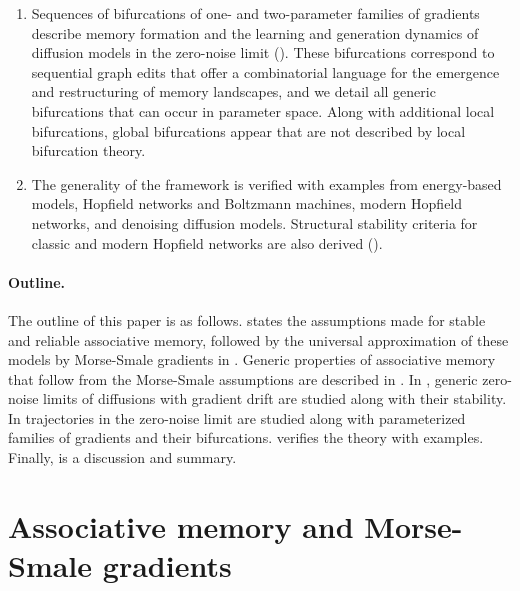 \documentclass[12pt]{article}
\begin{document}
\begin{enumerate}[label=(\roman*), itemsep=0pt]
    \item Sequences of bifurcations of one- and two-parameter families of gradients describe memory formation and the learning and generation dynamics of diffusion models in the zero-noise limit (). These bifurcations correspond to sequential graph edits that offer a combinatorial language for the emergence and restructuring of memory landscapes, and we detail all generic bifurcations that can occur in parameter space. Along with additional local bifurcations, global bifurcations appear that are not described by local bifurcation theory.
    
    \item The generality of the framework is verified with examples from energy-based models, Hopfield networks and Boltzmann machines, modern Hopfield networks, and denoising diffusion models. Structural stability criteria for classic and modern Hopfield networks are also derived ().
\end{enumerate}



\paragraph{Outline.}
The outline of this paper is as follows.  states the assumptions made for stable and reliable associative memory, followed by the universal approximation of these models by Morse-Smale gradients in . Generic properties of associative memory that follow from the Morse-Smale assumptions are described in . In , generic zero-noise limits of diffusions with gradient drift are studied along with their stability. In  trajectories in the zero-noise limit are studied along with parameterized families of gradients and their bifurcations.  verifies the theory with examples. Finally,  is a discussion and summary.





\section{Associative memory and Morse-Smale gradients}
\label{section:Morse-Smale-gradient-assocaiative-memory}
\end{document}

